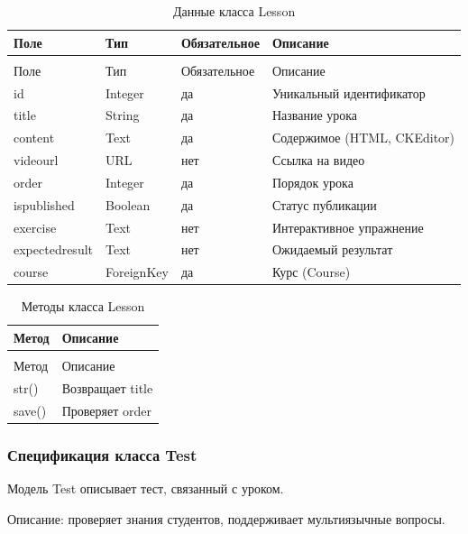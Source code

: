 \begin{xltabular}{\textwidth}{|l|l|l|X|}
	\caption{Данные класса Lesson\label{tab:lesson_attributes}}\\
	\hline
	Поле & Тип & Обязательное & Описание \\ \hline
	\endfirsthead
	\\
	\hline
	Поле & Тип & Обязательное & Описание \\ \hline
	\endhead
	id & Integer & да & Уникальный идентификатор \\ \hline
	title & String & да & Название урока \\ \hline
	content & Text & да & Содержимое (HTML, CKEditor) \\ \hline
	videourl & URL & нет & Ссылка на видео \\ \hline
	order & Integer & да & Порядок урока \\ \hline
	ispublished & Boolean & да & Статус публикации \\ \hline
	exercise & Text & нет & Интерактивное упражнение \\ \hline
	expectedresult & Text & нет & Ожидаемый результат \\ \hline
	course & ForeignKey & да & Курс (Course) \\ \hline
\end{xltabular}

\begin{xltabular}{\textwidth}{|l|X|}
	\caption{Методы класса Lesson\label{tab:lesson_methods}}\\
	\hline
	Метод & Описание \\ \hline
	\endfirsthead
	\\
	\hline
	Метод & Описание \\ \hline
	\endhead
	str() & Возвращает title \\ \hline
	save() & Проверяет order \\ \hline
\end{xltabular}

\subsubsection{Спецификация класса Test}

Модель Test описывает тест, связанный с уроком.

Описание: проверяет знания студентов, поддерживает мультиязычные вопросы.

